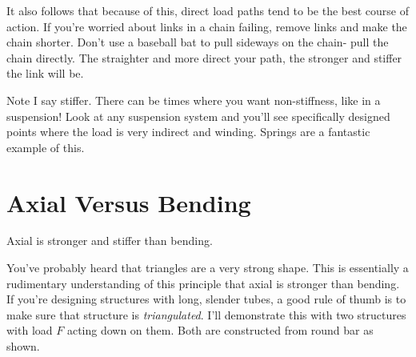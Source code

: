 It also follows that because of this, direct load paths tend to be the best course of action. If you're worried about links in a chain failing, remove links and make the chain shorter. Don't use a baseball bat to pull sideways on the chain- pull the chain directly. The straighter and more direct your path, the stronger and stiffer the link will be.

Note I say stiffer. There can be times where you want non-stiffness, like in a suspension! Look at any suspension system and you'll see specifically designed points where the load is very indirect and winding. Springs are a fantastic example of this.

\section{Axial Versus Bending}

\begin{theorem} \label{theorem:axial_bending}
	Axial is stronger and stiffer than bending.
\end{theorem}

You've probably heard that triangles are a very strong shape. This is essentially a rudimentary understanding of this principle that axial is stronger than bending. If you're designing structures with long, slender tubes, a good rule of thumb is to make sure that structure is \textit{triangulated}.
I'll demonstrate this with two structures with load $F$ acting down on them. Both are constructed from round bar as shown. 

